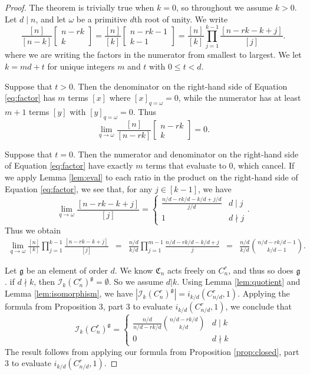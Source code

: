 \documentclass[12pt]{article}
\theoremstyle{definition}
\newcommand{\gau}[2]{\left[ \begin{array}{c} #1 \\ #2 \end{array} \right]}
\begin{document}
\begin{proof}
The theorem is trivially true when $k = 0$, so throughout we assume $k > 0.$
Let $d \mid n$, and let $\omega$ be a primitive $d$th root of unity.
We write
\begin{equation}\frac{[n]}{[n-k]}\gau{n-rk}{k} =\frac{[n]}{[k]}\gau{n-rk-1}{k-1} = \frac{[n]}{[k]}\prod_{j=1}^{k-1} \frac{[n-rk-k+j]}{[j]}. \label{eq:factor}\end{equation}
where we are writing the factors in the numerator from smallest to largest.
We let $k = md+t$ for unique integers $m$ and $t$ with $0 \leq t < d$.  

Suppose that $t > 0$. Then the denominator on the right-hand side of Equation \eqref{eq:factor} has $m$ terms $[x]$ where $[x]_{q=\omega} = 0$, while the numerator has at least $m+1$ terms $[y]$ with $[y]_{q=\omega} = 0 $. Thus
\[\lim_{q \to \omega} \frac{[n]}{[n-rk]} \gau{n-rk}{k} = 0. \]

Suppose that $t = 0$. Then the numerator and denominator on the right-hand side of Equation \eqref{eq:factor} have exactly $m$ terms that evaluate to $0$, which cancel. If we apply Lemma \ref{lem:eval} to each ratio in the product on the right-hand side of Equation \eqref{eq:factor}, we see that, for any $j \in [k-1]$, we have 
\[ \lim_{q \to \omega} \frac{[n-rk-k+j]}{[j]} = \begin{cases} \frac{n/d-rk/d-k/d+j/d}{j/d} & d \mid j \\ 1 & d \nmid j \end{cases}. \]
 Thus we obtain
\begin{align*} 
 \lim_{q \to \omega} \frac{[n]}{[k]}\prod_{j=1}^{k-1} \frac{[n-rk-k+j]}{[j]}& = & \frac{n/d}{k/d}\prod_{j=1}^{m-1} \frac{n/d-rk/d-k/d+j}{j} & = & \frac{n/d}{k/d}\binom{n/d-rk/d-1}{k/d-1}. 
\end{align*}

Let $\mathfrak{g}$ be an element of order $d$. We know $\mathfrak{C}_n$ acts freely on $C_n^r$, and thus so does $\mathfrak{g}$. if $d \nmid k$, then $\mathcal{I}_k(C_n^r)^{\mathfrak{g}} = \emptyset$. So we assume $d | k$. Using Lemma \ref{lem:quotient} and Lemma \ref{lem:isomorphism}, we have $|\mathcal{I}_{k}(C_n^r)^{\mathfrak{g}}| = i_{k/d}(C_{n/d}^r,1)$. Applying the formula from Proposition 3, part 3 to evaluate $i_{k/d}(C_{n/d}^r,1)$, we conclude that
\[\mathcal{I}_k(C_n^r)^{\mathfrak{g}} = \begin{cases} \frac{n/d}{n/d-rk/d}\binom{n/d-rk/d}{k/d} & d \mid k \\ 0 & d \nmid k\end{cases}\]
 The result follows from applying our formula from Proposition \ref{prop:closed}, part 3 to evaluate $i_{k/d}(C_{n/d}^r,1).$  
\end{proof}
\end{document}
